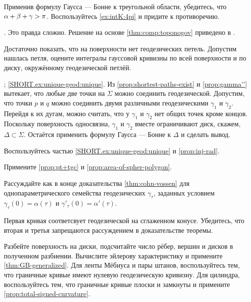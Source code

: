 Применив формулу Гаусса --- Бонне к треугольной области, убедитесь, что $\alpha+\beta\z+\gamma>\pi$.
Воспользуйтесь \ref{ex:intK:4pi} и придите к противоречию.

.
Это правда сложно.
Решение на основе \ref{thm:comp:toponogov} приведено в \cite{petrunin2021}.

Достаточно показать, что на поверхности нет геодезических петель.
Допустим нашлась петля, оцените интегралы гауссовой кривизны по всей поверхности и по диску, окружённому геодезической петлёй.

\parbf{\ref{ex:unique-geod}}; \ref{SHORT.ex:unique-geod:unique}.
Из \ref{prop:shortest-paths-exist} и \ref{prop:gamma''} вытекает, что любые две точки на $\Sigma$ можно соединить геодезической.
Допустим, что точки $p$ и $q$ можно соединить двумя различными геодезическими $\gamma_1$ и $\gamma_2$.
Перейдя к их дугам, можно считать, что у $\gamma_1$ и $\gamma_2$ нет общих точек кроме концов.
Поскольку поверхность односвязна, $\gamma_1$ и $\gamma_2$ вместе ограничивают диск, скажем, $\Delta\subset\Sigma$.
Остаётся применить формулу Гаусса --- Бонне к $\Delta$ и сделать вывод.

Воспользуйтесь частью \ref{SHORT.ex:unique-geod:unique} и \ref{prop:inj-rad}.

Примените \ref{prop:pt+tgc} и \ref{prop:area-of-spher-polygon}.

Рассуждайте как в конце доказательства \ref{thm:cohn-vossen} для однопараметрического семейства геодезических $\gamma_\tau$, заданных условием $\gamma_\tau(0)=\alpha(\tau)$ и $\gamma'_\tau(0)=\alpha'(\tau)$.

Первая кривая соответсвует геодезической на сглаженном конусе.
Убедитесь, что вторая и третья запрещаются рассуждением в доказательстве теоремы.

Разбейте поверхность на диски, подсчитайте число рёбер, вершин и дисков в полученном разбиении.
Вычислите эйлерову характеристику и примените \ref{thm:GB-generalized}.
Для ленты Мёбиуса и пары штанов, воспользуйтесь тем, что граничные кривые имеют нулевую геодезическую кривизну.
Для цилиндра, воспользуйтесь тем, что граничные кривые плоски и замкнуты и примените \ref{prop:total-signed-curvature}.    



